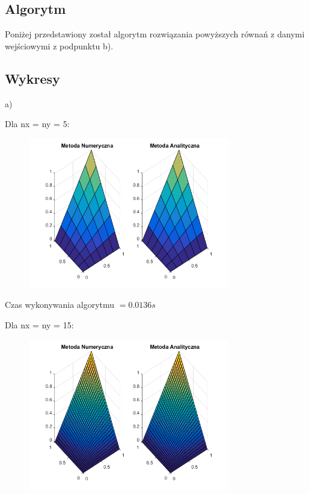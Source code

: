 \subsection{Algorytm}
Poniżej przedstawiony został algorytm rozwiązania powyższych równań z danymi wejściowymi z podpunktu b).
\begin{samepage}

\end{samepage}

\newpage

\subsection{Wykresy}

a)

Dla nx = ny = 5:

\begin{figure}[!ht]
	\begin{center}
		\includegraphics[width=0.78\textwidth]{Lab5/charts/zad1/5x5.png}
	\end{center}
\end{figure}

Czas wykonywania algorytmu $ = 0.0136 s$

Dla nx = ny = 15:

\begin{figure}[!ht]
	\begin{center}
		\includegraphics[width=0.78\textwidth]{Lab5/charts/zad1/15x15.png}
	\end{center}
\end{figure}

